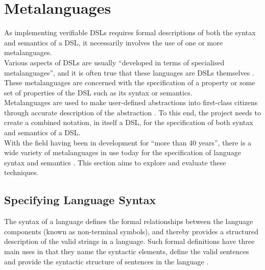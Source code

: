 \section{Metalanguages} %
\label{sec:metalanguages}

As implementing verifiable DSLs requires formal descriptions of both the syntax and semantics of a DSL, it necessarily involves the use of one or more metalanguages. \\

Various aspects of DSLs are usually ``developed in terms of specialised metalanguages'', and it is often true that these languages are DSLs themselves \citep{Mernik:2005:DDL:1118890.1118892}.
These metalanguages are concerned with the specification of a property or some set of properties of the DSL such as its syntax or semantics. \\

Metalanguages are used to make user-defined abstractions into first-class citizens through accurate description of the abstraction \citep{Siek:2010:GPL:1706356.1706358}.
To this end, the project needs to create a combined notation, in itself a DSL, for the specification of both syntax and semantics of a DSL. \\

With the field having been in development for ``more than 40 years'', there is a wide variety of metalanguages in use today for the specification of language syntax and semantics \citep{Zhang:2004:SSD:981009.981013}. 
This section aims to explore and evaluate these techniques. 

\subsection{Specifying Language Syntax} %
\label{sub:specifying_language_syntax}

The syntax of a language defines the formal relationships between the language components (known as non-terminal symbols), and thereby provides a structured description of the valid strings in a language. 
Such formal definitions have three main uses in that they name the syntactic elements, define the valid sentences and provide the syntactic structure of sentences in the language \citep{Scowen:1982:SSM:947912.947917,standard1996ebnf}.

